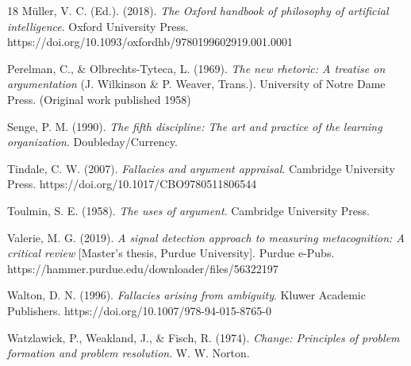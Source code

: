 \documentclass[11pt, a4paper]{article}
\begin{document}
\begin{thebibliography}{18}
Müller, V. C. (Ed.). (2018). \textit{The Oxford handbook of philosophy of artificial intelligence}. Oxford University Press. https://doi.org/10.1093/oxfordhb/9780199602919.001.0001

Perelman, C., \& Olbrechts-Tyteca, L. (1969). \textit{The new rhetoric: A treatise on argumentation} (J. Wilkinson \& P. Weaver, Trans.). University of Notre Dame Press. (Original work published 1958)

Senge, P. M. (1990). \textit{The fifth discipline: The art and practice of the learning organization}. Doubleday/Currency.

Tindale, C. W. (2007). \textit{Fallacies and argument appraisal}. Cambridge University Press. https://doi.org/10.1017/CBO9780511806544

Toulmin, S. E. (1958). \textit{The uses of argument}. Cambridge University Press.

Valerie, M. G. (2019). \textit{A signal detection approach to measuring metacognition: A critical review} [Master's thesis, Purdue University]. Purdue e-Pubs. https://hammer.purdue.edu/downloader/files/56322197

Walton, D. N. (1996). \textit{Fallacies arising from ambiguity}. Kluwer Academic Publishers. https://doi.org/10.1007/978-94-015-8765-0

Watzlawick, P., Weakland, J., \& Fisch, R. (1974). \textit{Change: Principles of problem formation and problem resolution}. W. W. Norton.

\end{thebibliography}
\end{document}
